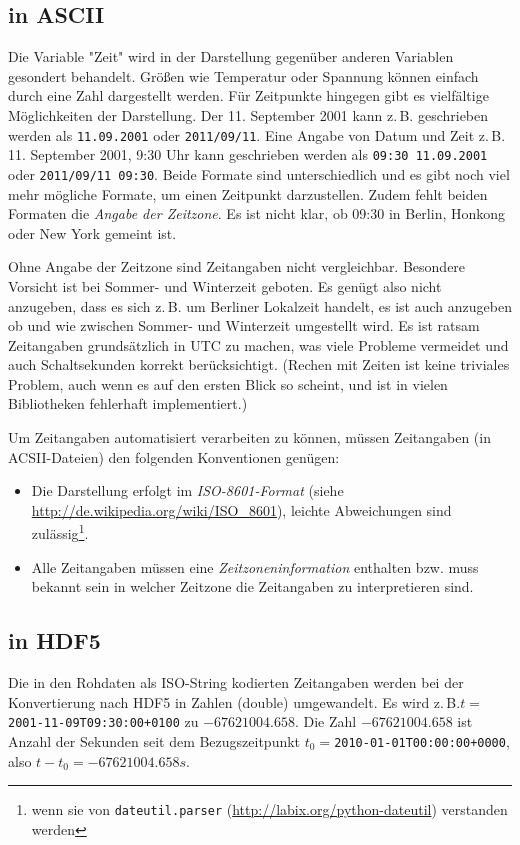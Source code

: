 \documentclass[version=last,
	a4paper,			%
	pagesize, 			%
	11pt,				%
	BCOR1cm,			%
	DIV12,	 			%
	pointlessnumbers,   %
	halfparskip,		%
]{scrreprt}
\newcommand{\zb}{z.\,B.\xspace}
\begin{document}
\subsection{in ASCII}
Die Variable "Zeit" wird in der Darstellung gegenüber anderen Variablen gesondert behandelt. Größen wie Temperatur oder Spannung können einfach durch eine Zahl dargestellt werden. Für Zeitpunkte hingegen gibt es vielfältige Möglichkeiten der Darstellung. Der 11. September 2001 kann \zb geschrieben werden als \texttt{11.09.2001} oder \texttt{2011/09/11}. Eine Angabe von Datum und Zeit \zb 11. September 2001, 9:30 Uhr kann geschrieben werden als \texttt{09:30 11.09.2001} oder \texttt{2011/09/11 09:30}. Beide Formate sind unterschiedlich und es gibt noch viel mehr mögliche Formate, um einen Zeitpunkt darzustellen. Zudem fehlt beiden Formaten die \emph{Angabe der Zeitzone}. Es ist nicht klar, ob 09:30 in Berlin, Honkong oder New York gemeint ist.

Ohne Angabe der Zeitzone sind Zeitangaben nicht vergleichbar. Besondere Vorsicht ist bei Sommer- und Winterzeit geboten. Es genügt also nicht anzugeben, dass es sich \zb um Berliner Lokalzeit handelt, es ist auch anzugeben ob und wie zwischen Sommer- und Winterzeit umgestellt wird. Es ist ratsam Zeitangaben grundsätzlich in UTC zu machen, was viele Probleme vermeidet und auch Schaltsekunden korrekt berücksichtigt. (Rechen mit Zeiten ist keine triviales Problem, auch wenn es auf den ersten Blick so scheint, und ist in vielen Bibliotheken fehlerhaft implementiert.)

Um Zeitangaben automatisiert verarbeiten zu können, müssen Zeitangaben (in ACSII-Dateien) den folgenden Konventionen genügen:
\begin{itemize}
  \item Die Darstellung erfolgt im \emph{ISO-8601-Format} (siehe \url{http://de.wikipedia.org/wiki/ISO_8601}), leichte Abweichungen sind zulässig\footnote{wenn sie von \texttt{dateutil.parser} (\url{http://labix.org/python-dateutil}) verstanden werden}.
  \item Alle Zeitangaben müssen eine \emph{Zeitzoneninformation} enthalten bzw. muss bekannt sein in welcher Zeitzone die Zeitangaben zu interpretieren sind.
\end{itemize}

\subsection{in HDF5}
Die in den Rohdaten als ISO-String kodierten Zeitangaben werden bei der Konvertierung nach HDF5 in Zahlen (double) umgewandelt. Es wird \zb $t=$\texttt{2001-11-09T09:30:00+0100} zu $-67621004.658$. Die Zahl $-67621004.658$ ist Anzahl der Sekunden seit dem Bezugszeitpunkt $t_0=$\texttt{2010-01-01T00:00:00+0000}, also $t-t_0=-67621004.658\si{s}$.
\end{document}
